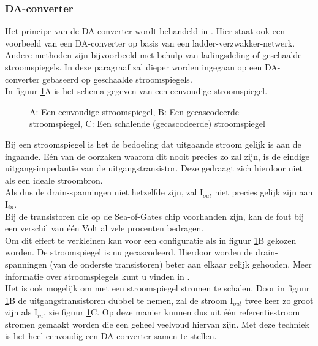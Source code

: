 \subsubsection{DA-converter}

Het principe van de DA-converter wordt behandeld in \cite{ET1205}.
Hier staat ook een voorbeeld van een DA-converter op basis van een ladder-verzwakker-netwerk.
Andere methoden zijn bijvoorbeeld met behulp van ladingsdeling of geschaalde stroomspiegels.
In deze paragraaf zal dieper worden ingegaan op een DA-converter
gebaseerd op geschaalde  stroomspiegels.\\
In figuur \ref{spiegels}A is het schema gegeven van een eenvoudige stroomspiegel. 

\begin{figure}[bth]
\centerline{}
\caption{A: Een eenvoudige stroomspiegel, B: Een gecascodeerde stroomspiegel, C: Een schalende (gecascodeerde) stroomspiegel}
\label{spiegels}
\end{figure}


Bij een stroomspiegel is het de bedoeling dat uitgaande stroom gelijk is aan de ingaande.
E\'en van de oorzaken waarom dit nooit precies zo zal zijn,
is de eindige uitgangsimpedantie van de uitgangstransistor.
Deze gedraagt zich hierdoor niet als een ideale stroombron.\\
Als dus de drain-spanningen niet hetzelfde zijn,
zal I$_{out}$ niet precies gelijk zijn aan I$_{in}$.\\
Bij de transistoren die op de Sea-of-Gates chip voorhanden zijn,
kan de fout bij een verschil van \'e\'en Volt al vele procenten bedragen.\\ 
Om dit effect te verkleinen kan voor een configuratie als in figuur \ref{spiegels}B gekozen worden.
De stroomspiegel is nu gecascodeerd.
Hierdoor worden de drain-spanningen (van de onderste transistoren) beter aan elkaar gelijk gehouden. 
Meer informatie over stroomspiegels kunt u vinden in \cite{ET1205}.\\
Het is ook mogelijk om met een stroomspiegel stromen te schalen.
Door in figuur \ref{spiegels}B de uitgangstransistoren dubbel te nemen,
zal de stroom I$_{out}$ twee keer zo groot zijn als I$_{in}$,
zie figuur \ref{spiegels}C.
Op deze manier kunnen dus uit \'e\'en referentiestroom stromen gemaakt worden die een geheel veelvoud hiervan zijn. 
Met deze techniek is het heel eenvoudig een DA-converter samen te stellen.


